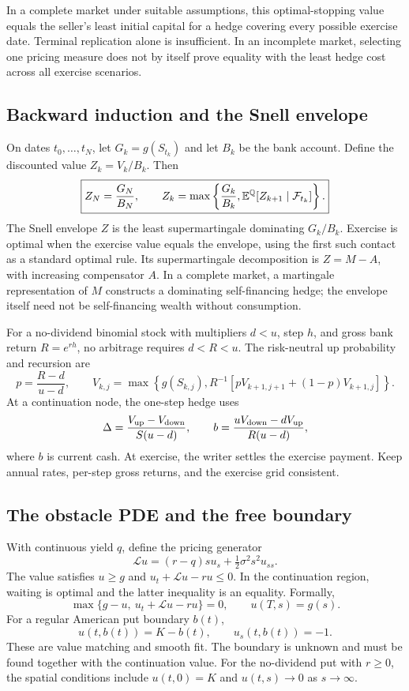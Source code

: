 In a complete market under suitable assumptions, this optimal-stopping
value equals the seller's least initial capital for a hedge covering every
possible exercise date. Terminal replication alone is insufficient. In an
incomplete market, selecting one pricing measure does not by itself prove
equality with the least hedge cost across all exercise scenarios.

\subsection{Backward induction and the Snell envelope}
On dates \(t_0,\ldots,t_N\), let \(G_k=g(S_{t_k})\) and let \(B_k\) be
the bank account. Define the discounted value \(Z_k=V_k/B_k\). Then
\[
\boxed{Z_N=\frac{G_N}{B_N},\qquad
Z_k=\max\left\{\frac{G_k}{B_k},\mathbb{E}^{\mathbb{Q}}[Z_{k+1}\mid\mathcal{F}_{t_k}]\right\}.}
\]
The Snell envelope \(Z\) is the least supermartingale dominating
\(G_k/B_k\). Exercise is optimal when the exercise value equals the
envelope, using the first such contact as a standard optimal rule.
Its supermartingale decomposition is \(Z=M-A\), with increasing
compensator \(A\). In a complete market, a martingale representation of
\(M\) constructs a dominating self-financing hedge; the envelope itself
need not be self-financing wealth without consumption.

For a no-dividend binomial stock with multipliers \(d<u\), step
\(h\), and gross bank return \(R=e^{rh}\), no arbitrage requires
\(d<R<u\). The risk-neutral up probability and recursion are
\[
p=\frac{R-d}{u-d},\qquad
V_{k,j}=\max\left\{g(S_{k,j}),
R^{-1}[pV_{k+1,j+1}+(1-p)V_{k+1,j}]\right\}.
\]
At a continuation node, the one-step hedge uses
\[
\Delta=\frac{V_{\rm up}-V_{\rm down}}{S(u-d)},\qquad
b=\frac{uV_{\rm down}-dV_{\rm up}}{R(u-d)},
\]
where \(b\) is current cash. At exercise, the writer settles the exercise
payment. Keep annual rates, per-step gross returns, and the exercise grid
consistent.

\subsection{The obstacle PDE and the free boundary}
With continuous yield \(q\), define the pricing generator
\[
\mathcal L u=(r-q)su_s+\tfrac12\sigma^2s^2u_{ss}.
\]
The value satisfies \(u\geq g\) and
\(u_t+\mathcal L u-ru\leq0\). In the continuation region, waiting is
optimal and the latter inequality is an equality. Formally,
\[
\boxed{\max\{g-u,\ u_t+\mathcal L u-ru\}=0,\qquad u(T,s)=g(s).}
\]
For a regular American put boundary \(b(t)\),
\[
u(t,b(t))=K-b(t),\qquad u_s(t,b(t))=-1.
\]
These are value matching and smooth fit. The boundary is unknown and must
be found together with the continuation value. For the no-dividend put
with \(r\geq0\), the spatial conditions include \(u(t,0)=K\) and
\(u(t,s)\to0\) as \(s\to\infty\).

